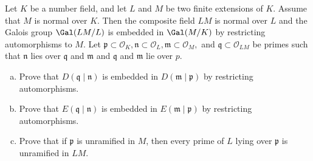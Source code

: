 \documentclass[11pt,letterpaper]{article}
\begin{document}
\begin{cproblem}{4.10}
    Let $K$ be a number field, and let $L$ and $M$ be two finite extensions of $K$. Assume that $M$ is normal over $K$. Then the composite field $LM$ is normal over $L$ and the Galois group $\Gal(LM/L)$ is embedded in $\Gal(M /K)$ by restricting automorphisms to $M$. Let $\mathfrak{p}\subset \mathcal{O}_K, \mathfrak{n}\subset \mathcal{O}_L, \mathfrak{m}\subset \mathcal{O}_M,$ and $\mathfrak{q}\subset \mathcal{O}_{LM}$ be primes such that $\mathfrak{n}$ lies over $\mathfrak{q}$ and $\mathfrak{m}$ and $\mathfrak{q}$ and $\mathfrak{m}$ lie over $p$.
    \begin{enumerate}[(a)]
        \item Prove that $D(\mathfrak{q}\mid \mathfrak{n})$ is embedded in $D(\mathfrak{m}\mid \mathfrak{p})$ by restricting automorphisms.
        \item Prove that $E(\mathfrak{q}\mid \mathfrak{n})$ is embedded in $E(\mathfrak{m}\mid \mathfrak{p})$ by restricting automorphisms.
        \item Prove that if $\mathfrak{p}$ is unramified in $M$, then every prime of $L$ lying over $\mathfrak{p}$ is unramified in $LM$.
    \end{enumerate}
\end{cproblem}
\end{document}
